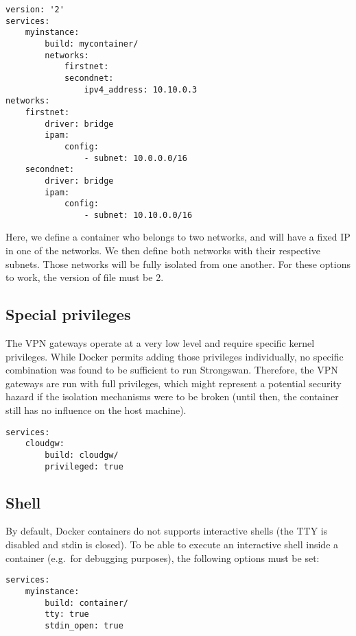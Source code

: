 \documentclass[paper=a4, fontsize=11pt]{scrartcl}
\begin{document}
\begin{verbatim}
version: '2'
services:
    myinstance:
        build: mycontainer/
        networks:
            firstnet:
            secondnet:
                ipv4_address: 10.10.0.3
networks:
    firstnet:
        driver: bridge
        ipam:
            config:
                - subnet: 10.0.0.0/16
    secondnet:
        driver: bridge
        ipam:
            config:
                - subnet: 10.10.0.0/16
\end{verbatim}

Here, we define a container who belongs to two networks, and will have a fixed
IP in one of the networks.
We then define both networks with their respective subnets.
Those networks will be fully isolated from one another.
For these options to work, the version of file must be 2.

\subsection{Special privileges}

The VPN gateways operate at a very low level and require specific kernel
privileges.
While Docker permits adding those privileges individually, no specific
combination was found to be sufficient to run Strongswan.
Therefore, the VPN gateways are run with full privileges, which might represent
a potential security hazard if the isolation mechanisms were to be broken (until
then, the container still has no influence on the host machine).

\begin{verbatim}
services:
    cloudgw:
        build: cloudgw/
        privileged: true
\end{verbatim}

\subsection{Shell}

By default, Docker containers do not supports interactive shells (the TTY is
disabled and stdin is closed).
To be able to execute an interactive shell inside a container (e.g.\ for
debugging purposes), the following options must be set:

\begin{verbatim}
services:
    myinstance:
        build: container/
        tty: true
        stdin_open: true
\end{verbatim}
\end{document}
